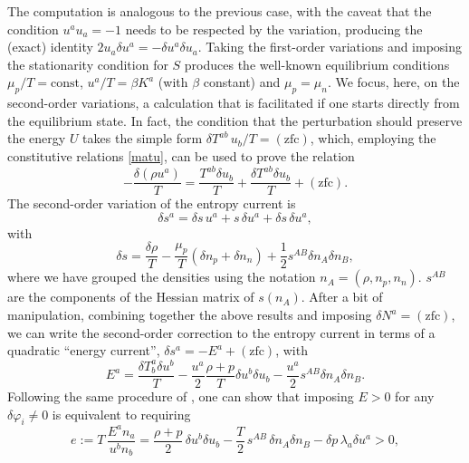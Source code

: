\documentclass[a4paper, amsfonts, amssymb, amsmath, reprint, showkeys, nofootinbib, twoside, onecolumn,notitlepage]{revtex4-1}
\begin{document}
The computation is analogous to the previous case, with the caveat that the condition $u^a u_a=-1$ needs to be respected by the variation, producing the (exact) identity $ 2 u_a \delta u^a=-\delta u^a \delta u_a$.
Taking the first-order variations and imposing the stationarity condition for $S$ produces the well-known equilibrium conditions $\mu_p/T=\text{const}$, $u^a/T = \beta K^a$ (with $\beta$ constant) and $\mu_p = \mu_n$. We focus, here, on the second-order variations, a calculation that is facilitated if one starts directly from the equilibrium state. In fact, the condition that the perturbation should preserve the energy $U$ takes the simple form $\delta T^{ab} \, u_b/T = (\text{zfc})$, which, employing the constitutive relations \eqref{matu}, can be used to prove the relation
\begin{equation}
- \dfrac{\delta(\rho u^a)}{T} = \dfrac{T^{ab} \delta u_b}{T} + \dfrac{\delta T^{ab} \delta u_b}{T} + (\text{zfc}).
\end{equation}
The second-order variation of the entropy current is
\begin{equation}
\delta s^a = \delta s \, u^a + s \, \delta u^a + \delta s \, \delta u^a,
\end{equation}
with
\begin{equation}
\delta s = \dfrac{ \delta \rho}{T} - \dfrac{\mu_p}{T} ( \delta n_p +\delta n_n)  + \dfrac{1}{2} s^{AB} \delta n_A \delta n_B, 
\end{equation}
where we have grouped the densities using the notation $n_A=(\rho,n_p,n_n)$. $s^{AB}$ are the components of the Hessian matrix of $s(n_A)$. After a bit of manipulation, combining together the above results and imposing $\delta N^a =(\text{zfc})$, we can write the second-order correction to the entropy current in terms of a quadratic ``energy current'', $\delta s^a = -E^a + (\text{zfc})$, with
\begin{equation}\label{Eachemo}
E^a = \dfrac{\delta T^a_b \delta u^b}{T} - \dfrac{u^a}{2} \dfrac{\rho + p}{T} \delta u^b \delta u_b - \dfrac{u^a}{2} s^{AB} \delta n_A \delta n_B .
\end{equation}
Following the same procedure of \citet{Hishcock1983}, one can show that imposing $E>0$ for any $\delta \varphi_i \neq 0$ is equivalent to requiring
\begin{equation}\label{ineqe}
 e := T \, \dfrac{E^a n_a}{u^b n_b}  = \dfrac{\rho+p}{2} \, \delta u^b \delta u_b- \dfrac{T}{2} \,  s^{AB} \, \delta n_A \delta n_B -\delta p \, \lambda_a \delta u^a>0,
\end{equation}
\end{document}
